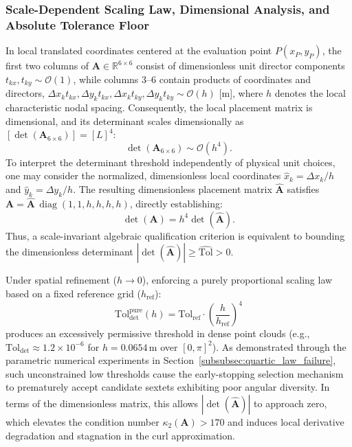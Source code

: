 \documentclass[preprint,12pt]{elsarticle}
\begin{document}
\subsubsection{Scale-Dependent Scaling Law, Dimensional Analysis, and Absolute Tolerance Floor}
\label{subsec:scale_dependent_floor}

In local translated coordinates centered at the evaluation point $P(x_P, y_P)$, the first two columns of $\mathbf{A} \in \mathbb{R}^{6 \times 6}$ consist of dimensionless unit director components $t_{kx}, t_{ky} \sim \mathcal{O}(1)$, while columns 3--6 contain products of coordinates and directors, $\Delta x_k t_{kx}, \Delta y_k t_{kx}, \Delta x_k t_{ky}, \Delta y_k t_{ky} \sim \mathcal{O}(h)$ [m], where $h$ denotes the local characteristic nodal spacing. Consequently, the local placement matrix is dimensional, and its determinant scales dimensionally as $[\det(\mathbf{A}_{6\times6})] = [L]^4$:
\begin{equation}
\det(\mathbf{A}_{6\times6}) \sim \mathcal{O}(h^4).
\label{eq:det_quartic_scaling}
\end{equation}
To interpret the determinant threshold independently of physical unit choices, one may consider the normalized, dimensionless local coordinates $\hat{x}_k = \Delta x_k / h$ and $\hat{y}_k = \Delta y_k / h$. The resulting dimensionless placement matrix $\widehat{\mathbf{A}}$ satisfies $\mathbf{A} = \widehat{\mathbf{A}} \, \operatorname{diag}(1, 1, h, h, h, h)$, directly establishing:
\begin{equation}
\det(\mathbf{A}) = h^4 \det(\widehat{\mathbf{A}}).
\label{eq:dimensionless_det_relation}
\end{equation}
Thus, a scale-invariant algebraic qualification criterion is equivalent to bounding the dimensionless determinant $|\det(\widehat{\mathbf{A}})| \ge \widehat{\mathrm{Tol}} > 0$.

Under spatial refinement ($h \to 0$), enforcing a purely proportional scaling law based on a fixed reference grid ($h_{\mathrm{ref}}$):
\begin{equation}
\mathrm{Tol}_{\mathrm{det}}^{\mathrm{pure}}(h) = \mathrm{Tol}_{\mathrm{ref}} \cdot \left( \frac{h}{h_{\mathrm{ref}}} \right)^4
\label{eq:pure_quartic_law}
\end{equation}
produces an excessively permissive threshold in dense point clouds (e.g., $\mathrm{Tol}_{\mathrm{det}} \approx 1.2 \times 10^{-6}$ for $h = 0.0654$\,m over $[0, \pi]^2$). As demonstrated through the parametric numerical experiments in Section~\ref{subsubsec:quartic_law_failure}, such unconstrained low thresholds cause the early-stopping selection mechanism to prematurely accept candidate sextets exhibiting poor angular diversity. In terms of the dimensionless matrix, this allows $|\det(\widehat{\mathbf{A}})|$ to approach zero, which elevates the condition number $\kappa_2(\mathbf{A}) > 170$ and induces local derivative degradation and stagnation in the curl approximation.
\end{document}
